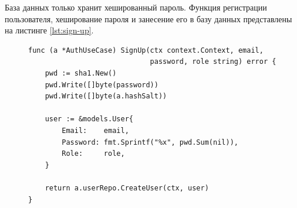 %
%
%
%

База данных только хранит хешированный пароль. Функция регистрации пользователя, хеширование пароля и занесение его в базу данных представлены на листинге \ref{lst:sign-up}.

\begin{figure}[H]
	\begin{lstlisting}[label=lst:sign-up,caption=Функция регистрации пользователя]
func (a *AuthUseCase) SignUp(ctx context.Context, email,
							 password, role string) error {
	pwd := sha1.New()
	pwd.Write([]byte(password))
	pwd.Write([]byte(a.hashSalt))

	user := &models.User{
		Email:    email,
		Password: fmt.Sprintf("%x", pwd.Sum(nil)),
		Role:     role,
	}

	return a.userRepo.CreateUser(ctx, user)
}
	\end{lstlisting}
\end{figure}

